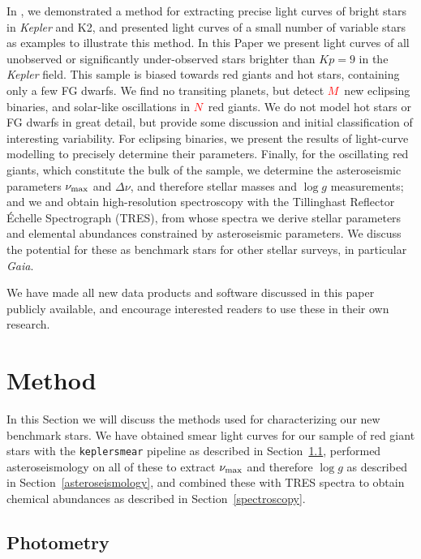 \documentclass[a4paper,fleqn,usenatbib]{mnras}
\newcommand{\numax}{\mbox{$\nu_{\rm max}$}\xspace}
\newcommand{\Dnu}{\mbox{$\Delta \nu$}\xspace}
\newcommand{\logg}{\mbox{$\log g$}\xspace}
\newcommand{\kepler}{\emph{Kepler}\xspace}
\newcommand{\gaia}{\emph{Gaia}\xspace}
\begin{document}
In \citet{smear}, we demonstrated a method for extracting precise light curves of bright stars in \kepler and K2, and presented light curves of a small number of variable stars as examples to illustrate this method. In this Paper we present light curves of all unobserved or significantly under-observed stars brighter than $Kp=9$ in the \kepler field. This sample is biased towards red giants and hot stars, containing only a few FG dwarfs. We find no transiting planets, but detect \textcolor{red}{$M$}~new eclipsing binaries, and solar-like oscillations in \textcolor{red}{$N$}~red giants. We do not model hot stars or FG dwarfs in great detail, but provide some discussion and initial classification of interesting variability. For eclipsing binaries, we present the results of light-curve modelling to precisely determine their parameters. Finally, for the oscillating red giants, which constitute the bulk of the sample, we determine the asteroseismic parameters \numax and \Dnu, and therefore stellar masses and \logg measurements; and we and obtain high-resolution spectroscopy with the Tillinghast Reflector \'{E}chelle Spectrograph (TRES), from whose spectra we derive stellar parameters and elemental abundances constrained by asteroseismic parameters. We discuss the potential for these as benchmark stars for other stellar surveys, in particular \gaia. 

We have made all new data products and software discussed in this paper publicly available, and encourage interested readers to use these in their own research.   

\section{Method}
\label{method}

In this Section we will discuss the methods used for characterizing our new benchmark stars. We have obtained smear light curves for our sample of red giant stars with the \texttt{keplersmear} pipeline as described in Section~\ref{photometry}, performed asteroseismology on all of these to extract \numax and therefore \logg as described in Section~\ref{asteroseismology}, and combined these with TRES spectra to obtain chemical abundances as described in Section~\ref{spectroscopy}. 

\subsection{Photometry}
\label{photometry}
\end{document}
